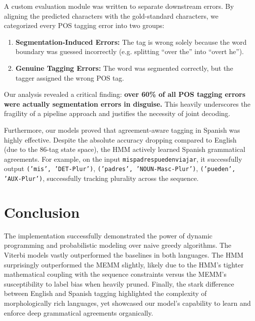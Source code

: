 \documentclass[11pt]{article}
\newcommand{\code}[1]{\texttt{\small #1}}
\begin{document}
A custom evaluation module was written to separate downstream errors. By aligning the predicted characters with the gold-standard characters, we categorized every POS tagging error into two groups:

\begin{enumerate}
    \item \textbf{Segmentation-Induced Errors:} The tag is wrong solely because the word boundary was guessed incorrectly (e.g. splitting ``over the'' into ``overt he'').
    \item \textbf{Genuine Tagging Errors:} The word was segmented correctly, but the tagger assigned the wrong POS tag.
\end{enumerate}

Our analysis revealed a critical finding: \textbf{over 60\% of all POS tagging errors were actually segmentation errors in disguise.} This heavily underscores the fragility of a pipeline approach and justifies the necessity of joint decoding.

Furthermore, our models proved that agreement-aware tagging in Spanish was highly effective. Despite the absolute accuracy dropping compared to English (due to the 86-tag state space), the HMM actively learned Spanish grammatical agreements. For example, on the input \code{mispadrespuedenviajar}, it successfully output \code{('mis', 'DET-Plur')}, \code{('padres', 'NOUN-Masc-Plur')}, \code{('pueden', 'AUX-Plur')}, successfully tracking plurality across the sequence.

\section{Conclusion}

The implementation successfully demonstrated the power of dynamic programming and probabilistic modeling over naive greedy algorithms. The Viterbi models vastly outperformed the baselines in both languages. The HMM surprisingly outperformed the MEMM slightly, likely due to the HMM's tighter mathematical coupling with the sequence constraints versus the MEMM's susceptibility to label bias when heavily pruned. Finally, the stark difference between English and Spanish tagging highlighted the complexity of morphologically rich languages, yet showcased our model's capability to learn and enforce deep grammatical agreements organically.
\end{document}
